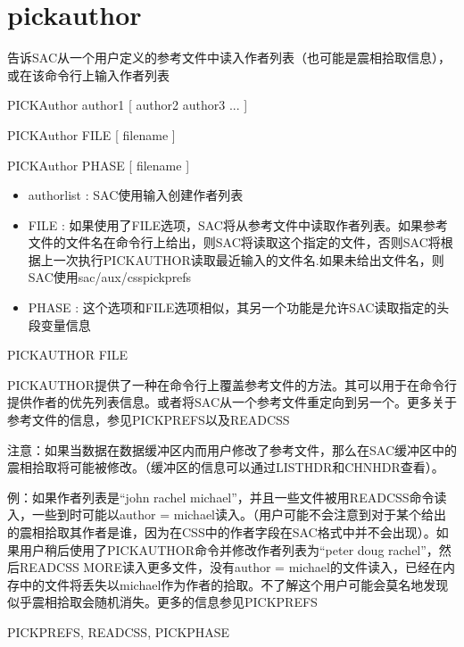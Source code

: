 \section{pickauthor}
\label{cmd:pickauthor}

告诉SAC从一个用户定义的参考文件中读入作者列表（也可能是震相拾取信息），或在该命令行上输入作者列表

PICKAuthor author1 [ author2 author3 ... ]

PICKAuthor FILE [ filename ]

PICKAuthor PHASE [ filename ]

\begin{itemize}
\item authorlist : SAC使用输入创建作者列表 
\item FILE : 如果使用了FILE选项，SAC将从参考文件中读取作者列表。如果参考文件的文件名在命令行上给出，则SAC将读取这个指定的文件，否则SAC将根据上一次执行PICKAUTHOR读取最近输入的文件名.如果未给出文件名，则SAC使用sac/aux/csspickprefs
\item PHASE : 这个选项和FILE选项相似，其另一个功能是允许SAC读取指定的头段变量信息 
\end{itemize}

PICKAUTHOR FILE

PICKAUTHOR提供了一种在命令行上覆盖参考文件的方法。其可以用于在命令行提供作者的优先列表信息。或者将SAC从一个参考文件重定向到另一个。更多关于参考文件的信息，参见PICKPREFS以及READCSS

注意：如果当数据在数据缓冲区内而用户修改了参考文件，那么在SAC缓冲区中的震相拾取将可能被修改。（缓冲区的信息可以通过LISTHDR和CHNHDR查看）。

例：如果作者列表是``john rachel michael''，并且一些文件被用READCSS命令读入，一些到时可能以author = michael读入。（用户可能不会注意到对于某个给出的震相拾取其作者是谁，因为在CSS中的作者字段在SAC格式中并不会出现）。如果用户稍后使用了PICKAUTHOR命令并修改作者列表为``peter doug rachel''，然后READCSS MORE读入更多文件，没有author = michael的文件读入，已经在内存中的文件将丢失以michael作为作者的拾取。不了解这个用户可能会莫名地发现似乎震相拾取会随机消失。更多的信息参见PICKPREFS

PICKPREFS, READCSS, PICKPHASE
